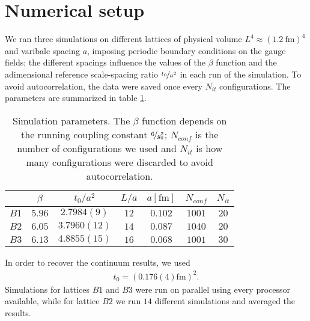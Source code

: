 \section{Numerical setup}%
\label{sec:numericalsetup}
We ran three simulations on different lattices of physical volume $L ^{4} \approx (\SI{1.2}{\femto\metre})^{4}$
and varibale spacing $a$, imposing periodic boundary conditions on the gauge fields;
the different spacings influence the values of the $\beta$ function and the adimensional reference scale-spacing ratio $\nicefrac{t_{0}}{a^{2}}$ in each run of the simulation. To avoid autocorrelation,
the data were saved once every $N_{it}$ configurations.
The parameters are summarized in table \ref{tab:numericalsetup}.

\begin{table}[h!]
\begin{tabular}{@{}ccccccc@{}}
\toprule
     & $\beta$ & $t_0/a^2$  & $L/a$ & $a[\si{\femto\metre}]$ & $N_{conf}$ & $N_{it}$ \\ \midrule
$B1$ & $5.96$  & $2.7984(9)$  & $12$  & $0.102$      & $1001$     & $20$      \\
$B2$ & $6.05$  & $3.7960(12)$ & $14$  & $0.087$      & $1040$     & $20$      \\
$B3$ & $6.13$  & $4.8855(15)$ & $16$  & $0.068$      & $1001$     & $30$      \\ \bottomrule
\end{tabular}
\caption{\label{tab:numericalsetup} Simulation parameters. The $\beta$ function depends on the running coupling constant $\nicefrac{6}{g_0^2}$; $N_{conf}$ is the number of configurations we used and $N_{it}$ is how many configurations were discarded to avoid autocorrelation.}
\end{table}
In order to recover the continuum results, we used
\begin{align}
  t_{0} = \left(0.176(4)\si{\femto\metre}\right)^2.
\end{align}
Simulations for lattices $B1$ and $B3$ were run on parallel using every processor available, while for lattice $B2$ we run $14$ different simulations and averaged the results.
